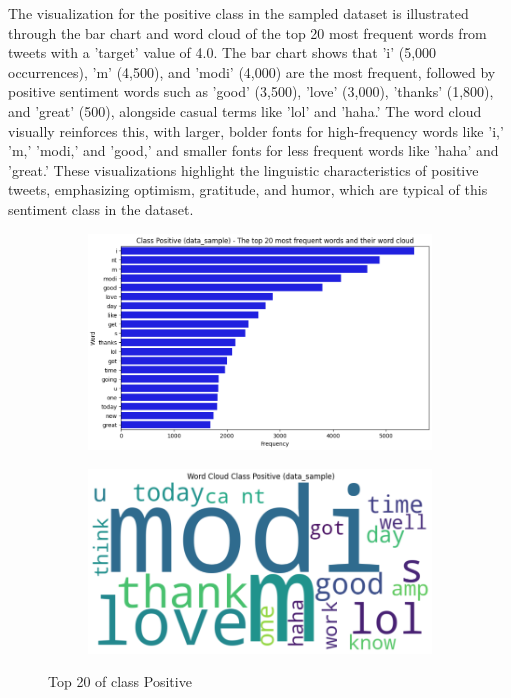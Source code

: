 The visualization for the positive class in the sampled dataset is illustrated through the bar chart and word cloud of the top 20 most frequent words from tweets with a 'target' value of 4.0. The bar chart shows that 'i' (5,000 occurrences), 'm' (4,500), and 'modi' (4,000) are the most frequent, followed by positive sentiment words such as 'good' (3,500), 'love' (3,000), 'thanks' (1,800), and 'great' (500), alongside casual terms like 'lol' and 'haha.' The word cloud visually reinforces this, with larger, bolder fonts for high-frequency words like 'i,' 'm,' 'modi,' and 'good,' and smaller fonts for less frequent words like 'haha' and 'great.' These visualizations highlight the linguistic characteristics of positive tweets, emphasizing optimism, gratitude, and humor, which are typical of this sentiment class in the dataset.

\begin{figure}[H]
    \centering
    \begin{subfigure}[b]{0.48\textwidth}
        \includegraphics[width=\textwidth]{img/visualize_pic/top20_posi.png}
    \end{subfigure}
    \begin{subfigure}[b]{0.48\textwidth}
        \includegraphics[width=\textwidth]{img/visualize_pic/posi_wordcloud.png}
    \end{subfigure}
    \caption{Top 20 of class Positive}
\end{figure}


